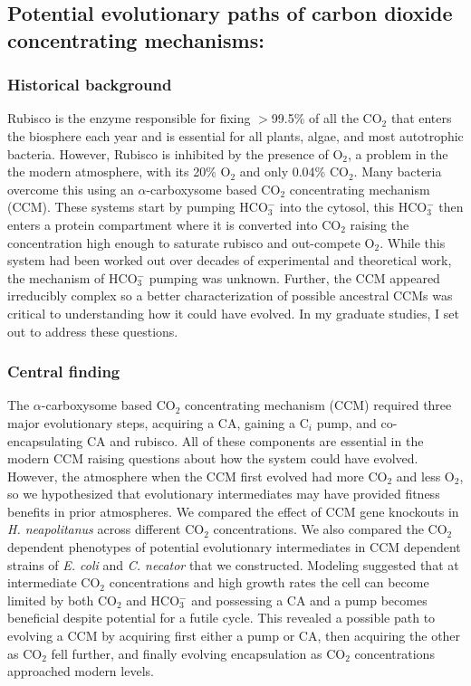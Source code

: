 \documentclass{article}
\begin{document}
\leavevmode\pagebreak

\newrefsection
\subsection{Potential evolutionary paths of carbon dioxide concentrating mechanisms:}\label{CCM_EVO}
\subsubsection{Historical background}
Rubisco is the enzyme responsible for fixing $>$99.5\% of all the CO$_2$ that enters the biosphere each year and is essential for all plants, algae, and most autotrophic bacteria. 
However, Rubisco is inhibited by the presence of O$_2$, a problem in the the modern atmosphere, with its 20\% O$_2$ and only 0.04\% CO$_2$.
Many bacteria overcome this using an $\alpha$-carboxysome based CO$_2$ concentrating mechanism (CCM).
These systems start by pumping HCO$_{3}^{-}$ into the cytosol, this HCO$_{3}^{-}$ then enters a protein compartment where it is converted into CO$_2$ raising the concentration high enough to saturate rubisco and out-compete O$_2$.
While this system had been worked out over decades of experimental and theoretical work, the mechanism of HCO$_{3}^{-}$ pumping was unknown.
Further, the CCM appeared irreducibly complex so a better characterization of possible ancestral CCMs was critical to understanding how it could have evolved.
In my graduate studies, I set out to address these questions.
%
\subsubsection{Central finding}
The $\alpha$-carboxysome based CO$_2$ concentrating mechanism (CCM) required three major evolutionary steps, acquiring a CA, gaining a C$_i$ pump, and co-encapsulating CA and rubisco.
All of these components are essential in the modern CCM raising questions about how the system could have evolved.
However, the atmosphere when the CCM first evolved had more CO$_2$ and less O$_2$, so we hypothesized that evolutionary intermediates may have provided fitness benefits in prior atmospheres.
We compared the effect of CCM gene knockouts in \textit{H. neapolitanus} across different CO$_2$ concentrations.
We also compared the CO$_2$ dependent phenotypes of potential evolutionary intermediates in CCM dependent strains of \textit{E. coli} and \textit{C. necator} that we constructed.
Modeling suggested that at intermediate CO$_2$ concentrations and high growth rates the cell can become limited by both CO$_2$ and HCO$_{3}^{-}$ and possessing a CA and a pump becomes beneficial despite potential for a futile cycle.
This revealed a possible path to evolving a CCM by acquiring first either a pump or CA, then acquiring the other as CO$_2$ fell further, and finally evolving encapsulation as CO$_2$ concentrations approached modern levels.
%
\end{document}
